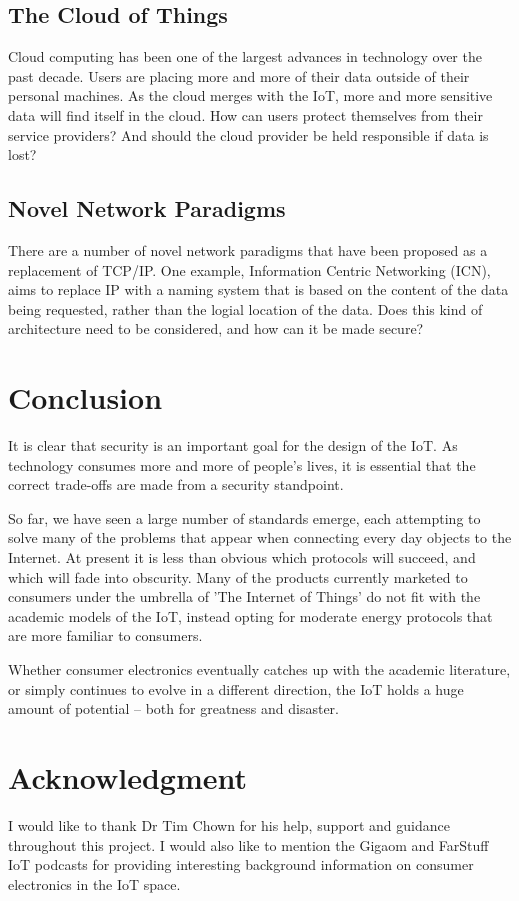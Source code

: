 \documentclass[10pt,journal,compsoc]{IEEEtran}
\begin{document}
\subsection{The Cloud of Things}
Cloud computing has been one of the largest advances in technology over the
past decade. Users are placing more and more of their data outside of their
personal machines. As the cloud merges with the IoT, more and more sensitive
data will find itself in the cloud. How can users protect themselves from their
service providers? And should the cloud provider be held responsible if data is
lost?

\subsection{Novel Network Paradigms}
There are a number of novel network paradigms that have been proposed as a
replacement of TCP/IP. One example, Information Centric Networking (ICN), aims
to replace IP with a naming system that is based on the content of the data
being requested, rather than the logial location of the data. Does this kind of
architecture need to be considered, and how can it be made secure?


\section{Conclusion}
It is clear that security is an important goal for the design of the IoT. As
technology consumes more and more of people's lives, it is essential that the
correct trade-offs are made from a security standpoint. 

So far, we have seen a large number of standards emerge, each attempting to
solve many of the problems that appear when connecting every day objects to the
Internet. At present it is less than obvious which protocols will succeed, and
which will fade into obscurity. Many of the products currently marketed to
consumers under the umbrella of 'The Internet of Things' do not fit with the
academic models of the IoT, instead opting for moderate energy protocols that
are more familiar to consumers. 

Whether consumer electronics eventually catches up with the academic
literature, or simply continues to evolve in a different direction, the IoT
holds a huge amount of potential -- both for greatness and disaster.  


\section*{Acknowledgment}
I would like to thank Dr Tim Chown for his help, support and guidance
throughout this project. I would also like to mention the Gigaom and FarStuff
IoT podcasts for providing interesting background information on consumer
electronics in the IoT space. 
\end{document}
